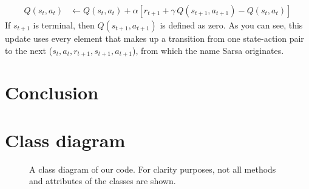 \documentclass{article}
\begin{document}
\begin{align*}
Q(s_t,a_t) & \leftarrow Q(s_t,a_t) + \alpha \left[ r_{t+1} + \gamma \, Q(s_{t+1},a_{t+1}) - Q(s_t,a_t) \right]
\end{align*}
If $s_{t+1}$ is terminal, then $Q(s_{t+1},a_{t+1})$ is defined as zero. As you can see, this update uses every element that makes up a transition from one state-action pair to the next ($s_t,a_t,r_{t+1},s_{t+1},a_{t+1}$), from which the name Sarsa originates.


\section{Conclusion}

\newpage
\nocite{*}



\newpage
\appendix
\appendixpage
\clearpage
\section{Class diagram}\label{app:classDiagram}
\begin{figure}[htb]
        \caption{\label{pic:classDiagram} A class diagram of our code. For clarity purposes, not all methods and attributes of the classes are shown.}
\end{figure}
\end{document}
